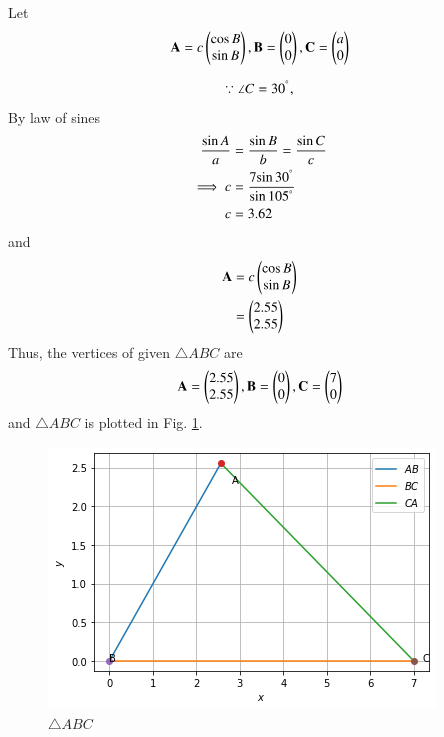 Let 
\begin{align}
 \mathbf{A}=c\begin{pmatrix}\cos B\\\sin B\end{pmatrix},\mathbf{B}=\begin{pmatrix}0\\0\end{pmatrix},\mathbf{C}=\begin{pmatrix}a\\0\end{pmatrix}   
 \end{align}

\begin{align}
\because \angle C = 30^{\degree},
\end{align}
By law of sines
\begin{align}
\frac{\sin A}{a} &=\frac{\sin B}{b}=\frac{\sin C}{c}
\\
\implies c &=\frac{7{\sin 30^{\degree}}}{\sin 105^{\degree}}
\\
c &=3.62
\end{align}
and 
\begin{align}
 \mathbf{A} &=c\begin{pmatrix}\cos B\\\sin B\end{pmatrix}
 \\
  &=\begin{pmatrix}2.55\\2.55\end{pmatrix}
 \end{align}
Thus, the vertices of given $\triangle ABC$ are
\begin{align}
\mathbf{A}=\begin{pmatrix}2.55\\2.55\end{pmatrix},\mathbf{B}=\begin{pmatrix}0\\0\end{pmatrix},\mathbf{C} =\begin{pmatrix}7\\0\end{pmatrix}
\end{align}
and  $\triangle ABC$ is plotted in Fig.  \ref{constr/5/fig:triangle ABC}.
%
\begin{figure}[!ht]
\centering
\includegraphics[width=\columnwidth]{solutions/triangle/5/Assignment1 (1)/figure.png}
\caption{$\triangle ABC$}
 \label{constr/5/fig:triangle ABC}
\end{figure}    
